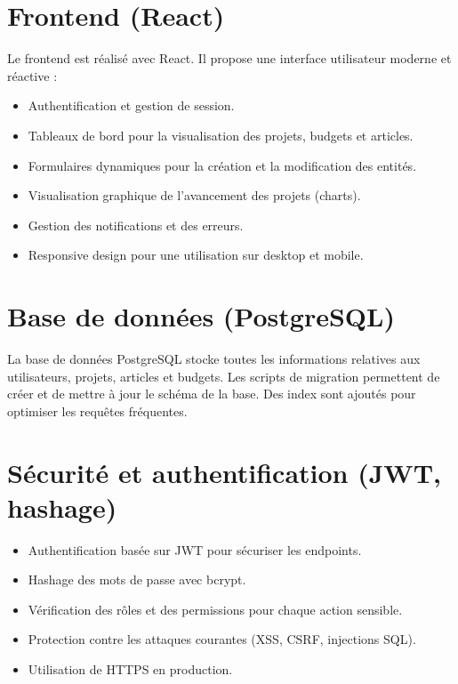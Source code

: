 \documentclass[12pt,a4paper]{report}
\begin{document}
\section{Frontend (React)}

Le frontend est réalisé avec React. Il propose une interface utilisateur moderne et réactive :
\begin{itemize}
    \item Authentification et gestion de session.
    \item Tableaux de bord pour la visualisation des projets, budgets et articles.
    \item Formulaires dynamiques pour la création et la modification des entités.
    \item Visualisation graphique de l’avancement des projets (charts).
    \item Gestion des notifications et des erreurs.
    \item Responsive design pour une utilisation sur desktop et mobile.
\end{itemize}

\section{Base de données (PostgreSQL)}

La base de données PostgreSQL stocke toutes les informations relatives aux utilisateurs, projets, articles et budgets. Les scripts de migration permettent de créer et de mettre à jour le schéma de la base. Des index sont ajoutés pour optimiser les requêtes fréquentes.

\section{Sécurité et authentification (JWT, hashage)}

\begin{itemize}
    \item Authentification basée sur JWT pour sécuriser les endpoints.
    \item Hashage des mots de passe avec bcrypt.
    \item Vérification des rôles et des permissions pour chaque action sensible.
    \item Protection contre les attaques courantes (XSS, CSRF, injections SQL).
    \item Utilisation de HTTPS en production.
\end{itemize}
\end{document}
